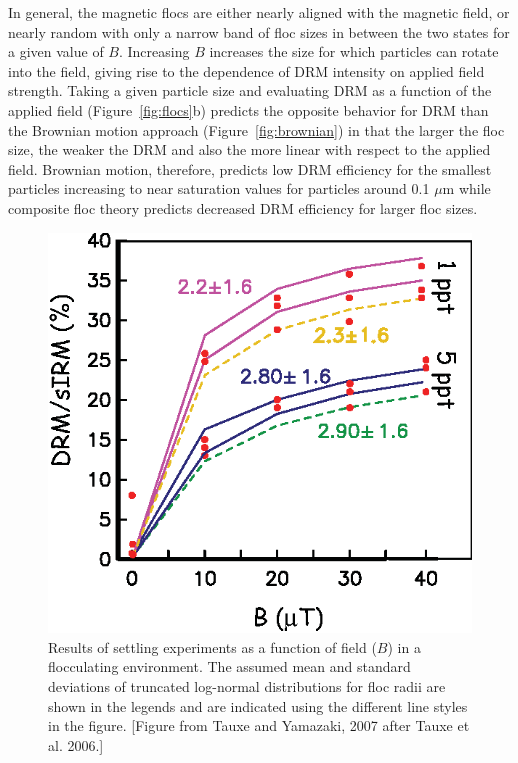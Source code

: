    In general, the magnetic flocs are either nearly aligned with the magnetic field, or nearly random with only a narrow band of floc sizes in between the two states for a given value of $B$.  Increasing $B$ increases the size for which particles can rotate into the field, giving rise to the dependence of DRM intensity on applied field strength.   Taking a given particle size and evaluating DRM as a function of the applied field (Figure~\ref{fig:flocs}b)  predicts  the opposite behavior for DRM than the Brownian motion approach (Figure~\ref{fig:brownian}) in that the larger the floc size, the weaker the DRM and also the more linear with respect to the applied field.     Brownian motion, therefore, predicts low DRM efficiency for the smallest particles  increasing to near saturation values for particles around 0.1 $\mu$m while composite floc theory  predicts decreased  DRM efficiency for larger floc sizes.   

\begin{figure}[htb]
\centering  \includegraphics[width=8 cm]{EPSfiles/drm-exp.eps}
\caption{
Results of settling  experiments as a function of field ($B$) in a flocculating environment.    The assumed mean and standard deviations of truncated log-normal distributions for floc radii are shown in the legends  and are indicated using the different line styles in the figure.    [Figure from  Tauxe and Yamazaki, 2007 after Tauxe et al. 2006.]}
\label{fig:drm-exp}
\end{figure}

